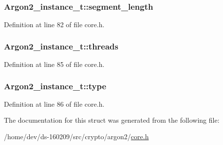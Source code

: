 \subsubsection[{segment\+\_\+length}]{ Argon2\+\_\+instance\+\_\+t\+::segment\+\_\+length}\label{struct_argon2__instance__t_a027cbd7a67c433446811f3c0f00099be}


Definition at line 82 of file core.\+h.

\hypertarget{struct_argon2__instance__t_ae44c8933040075bc8b4fc3d15b170a2f}{}
\subsubsection[{threads}]{ Argon2\+\_\+instance\+\_\+t\+::threads}\label{struct_argon2__instance__t_ae44c8933040075bc8b4fc3d15b170a2f}


Definition at line 85 of file core.\+h.

\hypertarget{struct_argon2__instance__t_a5632fb070b91ef79ed3a7f915b032d90}{}
\subsubsection[{type}]{ Argon2\+\_\+instance\+\_\+t\+::type}\label{struct_argon2__instance__t_a5632fb070b91ef79ed3a7f915b032d90}


Definition at line 86 of file core.\+h.



The documentation for this struct was generated from the following file\+:\begin{DoxyCompactItemize}
\item 
/home/dev/ds-\/160209/src/crypto/argon2/\hyperlink{core_8h}{core.\+h}\end{DoxyCompactItemize}
